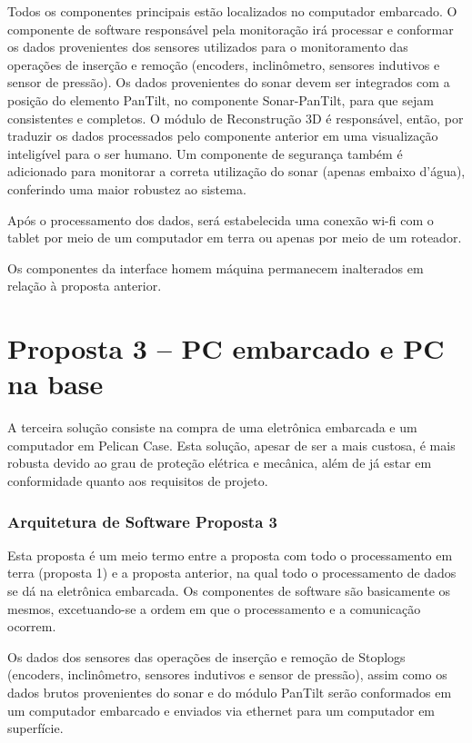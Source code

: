 Todos os componentes principais estão localizados no computador embarcado.
O componente de software responsável pela monitoração irá processar e conformar
os dados provenientes dos sensores utilizados para o monitoramento das operações
de inserção e remoção (encoders, inclinômetro, sensores indutivos
 e sensor de pressão). Os dados provenientes do sonar devem ser integrados com a
 posição do elemento PanTilt,
  no componente Sonar-PanTilt, para que sejam consistentes e completos.  O
  módulo de Reconstrução 3D é responsável,
   então, por traduzir os dados processados pelo componente anterior em uma
   visualização inteligível para o ser humano.
Um componente de segurança também é adicionado para monitorar a correta
utilização do sonar (apenas embaixo d’água), conferindo uma maior robustez ao
sistema.

Após o processamento dos dados, será estabelecida uma conexão wi-fi com o tablet
por meio de um computador em terra ou
 apenas por meio de um roteador.
 
Os componentes da interface homem máquina permanecem inalterados em relação à
proposta anterior.
 

\section{Proposta 3 – PC embarcado e PC na base}

A terceira solução consiste na compra de uma eletrônica embarcada e um
computador em Pelican Case. Esta solução, apesar de ser a mais custosa, é mais
robusta devido ao grau de proteção elétrica e mecânica, além de já estar em
conformidade quanto aos requisitos de projeto.

\subsubsection{Arquitetura de Software Proposta 3}
Esta proposta é um meio termo entre a proposta com todo o processamento em terra
(proposta 1) e a proposta anterior, na qual todo o processamento de dados se dá
na eletrônica embarcada. Os componentes de software são basicamente os mesmos,
excetuando-se a ordem em que o processamento e a comunicação ocorrem.

Os dados dos sensores das operações de inserção e remoção de Stoplogs
(encoders, inclinômetro, sensores indutivos e sensor de pressão), assim como os
dados brutos provenientes do sonar e do módulo PanTilt serão conformados em um
computador embarcado e enviados via ethernet para um computador em superfície.

